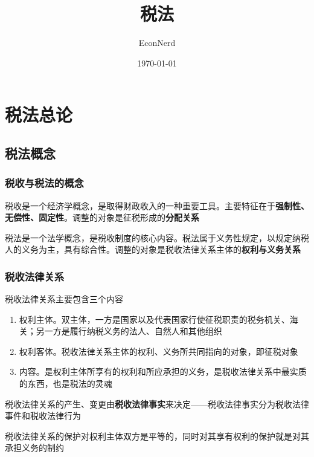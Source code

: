 \documentclass[UTF8,12pt]{ctexart}
\title{税法} %
\author{EconNerd}
\date{\today}
\numberwithin{equation}{section} %
\numberwithin{figure}{section}
\numberwithin{table}{section}
\begin{document}
	\maketitle
	\tableofcontents
	\newpage
	
	\section{税法总论}
	\subsection{税法概念}
	\subsubsection{税收与税法的概念}
	税收是一个经济学概念，是取得财政收入的一种重要工具。主要特征在于\textbf{强制性、无偿性、固定性}。调整的对象是征税形成的\textbf{分配关系}
	
	税法是一个法学概念，是税收制度的核心内容。税法属于义务性规定，以规定纳税人的义务为主，具有综合性。调整的对象是税收法律关系主体的\textbf{权利与义务关系}
	
	\subsubsection{税收法律关系}
	税收法律关系主要包含三个内容
	\begin{enumerate}
		\item 权利主体。双主体，一方是国家以及代表国家行使征税职责的税务机关、海关；另一方是履行纳税义务的法人、自然人和其他组织
		
		\item 权利客体。税收法律关系主体的权利、义务所共同指向的对象，即征税对象
		
		\item 内容。是权利主体所享有的权利和所应承担的义务，是税收法律关系中最实质的东西，也是税法的灵魂
	\end{enumerate}
	
	税收法律关系的产生、变更由\textbf{税收法律事实}来决定——税收法律事实分为税收法律事件和税收法律行为
	
	税收法律关系的保护对权利主体双方是平等的，同时对其享有权利的保护就是对其承担义务的制约
	
\end{document}
